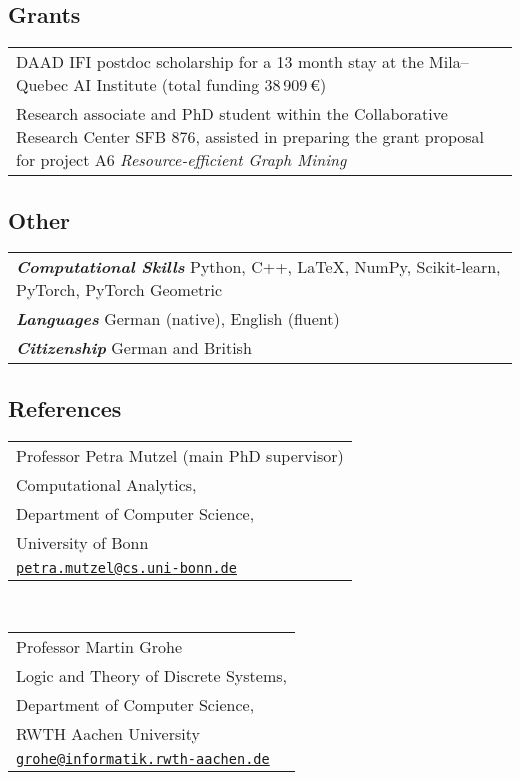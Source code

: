 \documentclass[11pt, a4paper, DIV=12]{scrartcl}
\begin{document}
\subsection*{Grants}
\begin{tabular}{p{14.5cm}}
	DAAD IFI postdoc scholarship for a 13 month stay at the Mila--Quebec AI Institute (total funding 38\,909\,€)\\[0.5em]
	
	Research associate and PhD student  within the Collaborative Research Center SFB 876, assisted in preparing the  grant proposal for project A6 \emph{Resource-efficient Graph Mining}
\end{tabular}


\subsection*{Other}

\begin{tabular}{l}
	\textsf{\textbf{\em Computational Skills}} Python, C\hspace{-1pt}+\hspace{-1pt}+, \LaTeX, NumPy, Scikit-learn, PyTorch, PyTorch Geometric\\
	\textsf{\textbf{\em Languages}} German (native), English (fluent)\\
	\textsf{\textbf{\em Citizenship}} German and British
\end{tabular}





\subsection*{References}

\begin{tabular}{l}
	Professor Petra Mutzel (main PhD supervisor)\\
	Computational Analytics,\\ 
	Department of Computer Science,\\
	University of Bonn \\
	\href{mailto:petra.mutzel@cs.uni-bonn.de}{\texttt{petra.mutzel@cs.uni-bonn.de}}\\
\end{tabular}\\[0.5em]


\begin{tabular}{l}
	Professor Martin Grohe\\
	Logic and Theory of Discrete Systems,\\ 
	Department of Computer Science,\\
	RWTH Aachen University \\
	\href{mailto:grohe@informatik.rwth-aachen.de}{\texttt{grohe@informatik.rwth-aachen.de}}\\
\end{tabular}\\[0.5em]
\end{document}
